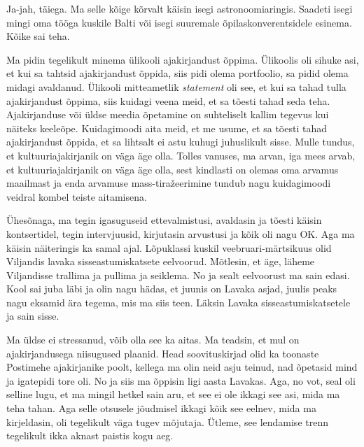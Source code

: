 
Ja-jah, täiega. Ma selle kõige kõrvalt käisin isegi astronoomiaringis. Saadeti 
isegi mingi oma tööga kuskile Balti või isegi suuremale  
õpilaskonverentsidele esinema. Kõike sai teha.


Ma pidin tegelikult minema ülikooli ajakirjandust õppima. Ülikoolis oli sihuke 
asi, et kui sa tahtsid ajakirjandust õppida, siis pidi olema portfoolio, sa 
pidid olema midagi avaldanud. Ülikooli mitteametlik \emph{statement} oli see, 
et kui sa tahad tulla ajakirjandust õppima, siis kuidagi veena meid, et sa 
tõesti tahad seda teha. Ajakirjanduse või üldse meedia õpetamine on 
 suhteliselt kallim tegevus kui näiteks keeleõpe. Kuidagimoodi aita 
meid, et me usume, et sa tõesti tahad ajakirjandust õppida, et sa lihtsalt ei  astu 
kuhugi juhuslikult sisse. Mulle tundus, et kultuuriajakirjanik on väga äge olla. Tolles vanuses, 
ma arvan, iga mees arvab, et  kultuuriajakirjanik on väga äge olla, sest 
kindlasti on olemas oma arvamus maailmast ja enda arvamuse mass-tiražeerimine  tundub 
nagu kuidagimoodi veidral kombel teiste aitamisena.

Ühesõnaga, ma tegin igasuguseid ettevalmistusi, avaldasin ja tõesti käisin 
kontsertidel, tegin intervjuusid, kirjutasin arvustusi ja kõik oli nagu OK. 
Aga ma käisin näiteringis ka samal ajal. Lõpuklassi kuskil veebruari-märtsikuus 
olid Viljandis lavaka sisseastumiskatsete 
eelvoorud. Mõtlesin, et äge, läheme Viljandisse trallima ja pullima ja 
seiklema. No ja sealt eelvoorust ma sain edasi. Kool sai juba läbi ja  olin 
nagu hädas, et juunis on Lavaka asjad,  juulis peaks nagu eksamid 
ära tegema, mis ma siis teen. Läksin Lavaka sisseastumiskatsetele ja sain sisse.

Ma üldse ei stressanud, võib olla see ka aitas. Ma teadsin, et mul on
ajakirjandusega  niisugused plaanid. Head soovituskirjad olid ka 
toonaste Postimehe ajakirjanike poolt, kellega ma olin neid 
asju teinud, nad õpetasid mind ja igatepidi tore oli. No ja siis ma õppisin 
ligi aasta Lavakas. Aga, no vot, seal oli selline lugu, et ma 
mingil hetkel sain aru, et see ei ole ikkagi see asi, mida ma teha tahan. Aga 
selle otsusele jõudmisel ikkagi  kõik see eelnev, mida ma kirjeldasin, oli 
tegelikult väga tugev mõjutaja. Ütleme,  see lendamise trenn tegelikult ikka aknast 
paistis kogu aeg. 

